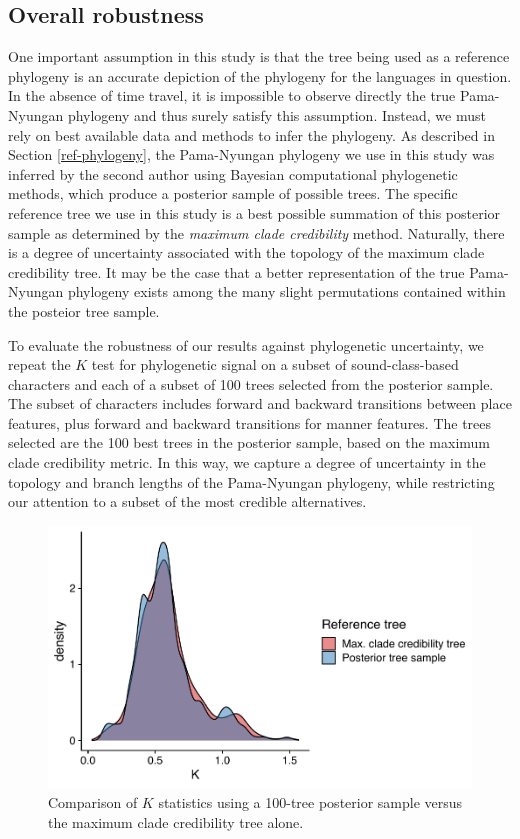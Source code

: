 \hypertarget{overall-robustness}{%
\subsection{Overall robustness}\label{overall-robustness}}

One important assumption in this study is that the tree being used as a reference phylogeny is an accurate depiction of the phylogeny for the languages in question. In the absence of time travel, it is impossible to observe directly the true Pama-Nyungan phylogeny and thus surely satisfy this assumption. Instead, we must rely on best available data and methods to infer the phylogeny. As described in Section \ref{ref-phylogeny}, the Pama-Nyungan phylogeny we use in this study was inferred by the second author using Bayesian computational phylogenetic methods, which produce a posterior sample of possible trees. The specific reference tree we use in this study is a best possible summation of this posterior sample as determined by the \emph{maximum clade credibility} method. Naturally, there is a degree of uncertainty associated with the topology of the maximum clade credibility tree. It may be the case that a better representation of the true Pama-Nyungan phylogeny exists among the many slight permutations contained within the posteior tree sample.

To evaluate the robustness of our results against phylogenetic uncertainty, we repeat the \(K\) test for phylogenetic signal on a subset of sound-class-based characters and each of a subset of 100 trees selected from the posterior sample. The subset of characters includes forward and backward transitions between place features, plus forward and backward transitions for manner features. The trees selected are the 100 best trees in the posterior sample, based on the maximum clade credibility metric. In this way, we capture a degree of uncertainty in the topology and branch lengths of the Pama-Nyungan phylogeny, while restricting our attention to a subset of the most credible alternatives.

\begin{figure}

{\centering \includegraphics[width=0.66\linewidth]{05-phylo-signal/fig/k-mcct-posterior} 

}

\caption{Comparison of $K$ statistics using a 100-tree posterior sample versus the maximum clade credibility tree alone.}\label{fig:tree-uncertainty}
\end{figure}

